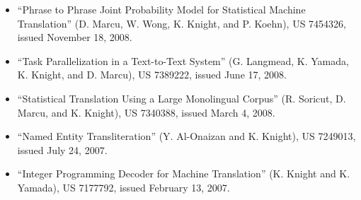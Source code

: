 \begin{itemize}
\item ``Phrase to Phrase Joint Probability Model for Statistical 
Machine Translation'' (D. Marcu, W. Wong, K. Knight, and P. Koehn),
US 7454326, issued November 18, 2008.

\item ``Task Parallelization in a Text-to-Text System''
(G. Langmead, K. Yamada, K. Knight, and D. Marcu),
US 7389222, issued June 17, 2008.

\item ``Statistical Translation Using a Large Monolingual Corpus''
(R. Soricut, D. Marcu, and K. Knight),
US 7340388, issued March 4, 2008.

\item ``Named Entity Transliteration'' (Y. Al-Onaizan and K. Knight),
US 7249013, issued July 24, 2007.

\item ``Integer Programming Decoder for Machine Translation''
(K. Knight and K. Yamada),
US 7177792, issued February 13, 2007.
\end{itemize}








